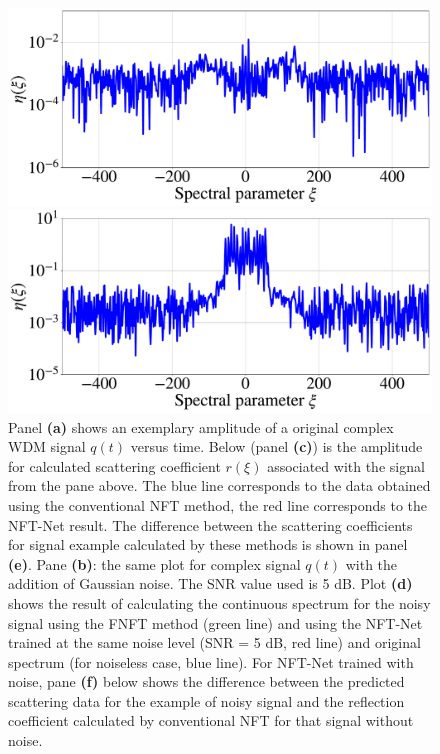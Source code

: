 \begin{figure}[htbp]
\begin{minipage}{.47\textwidth}
  \centering
  \includegraphics[width=1.\linewidth]{images/nn_nft/scirep_spectrum_diff_example.pdf}
\end{minipage}
\hfill
\begin{minipage}{.47\textwidth}
  \centering
  \includegraphics[width=1.\linewidth]{images/nn_nft/scirep_spectrum_diff_wn_example.pdf}
\end{minipage}


\caption{Panel \textbf{(a)} shows an exemplary amplitude of a original complex WDM signal $q(t)$ versus time. Below (panel \textbf{(c)}) is the amplitude for calculated scattering coefficient $r(\xi)$ associated with the signal from the pane above. The blue line corresponds to the data obtained using the conventional NFT method, the red line corresponds to the NFT-Net result. The difference between the scattering coefficients for signal example calculated by these methods is shown in panel \textbf{(e)}. Pane \textbf{(b)}: the same plot for complex signal $q(t)$ with the addition of Gaussian noise. The SNR value used is 5 dB. Plot \textbf{(d)} shows the result of calculating the continuous spectrum for the noisy signal using the FNFT method (green line) and using the NFT-Net trained at the same noise level (SNR = 5 dB, red line) and original spectrum (for noiseless case, blue line). For NFT-Net trained with noise, pane \textbf{(f)} below shows the difference between the predicted scattering data for the example of noisy signal and the reflection coefficient calculated by conventional NFT for that signal without noise.}
\label{fig:wdm_and_spectrum}
\end{figure}


